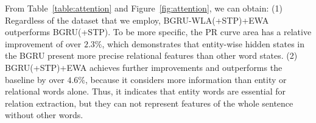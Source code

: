 \documentclass[11pt,a4paper]{article}
\begin{document}
  \begin{table*}[htbp]
    \centering
    \caption{P@N for relation extraction in the entity pairs with different number of sentences}
    \label{table:P@N}
  \end{table*}

  From Table~\ref{table:attention} and Figure~\ref{fig:attention}, we can obtain: (1) Regardless of the dataset that we employ, BGRU-WLA(+STP)+EWA outperforms BGRU(+STP). To be more specific, the PR curve area has a relative improvement of over $2.3\%$, which demonstrates that entity-wise hidden states in the BGRU present more precise relational features than other word states. (2) BGRU(+STP)+EWA achieves further improvements and outperforms the baseline by over $4.6\%$, because it considers more information than entity or relational words alone. Thus, it indicates that entity words are essential for relation extraction, but they can not represent features of the whole sentence without other words.
\end{document}

